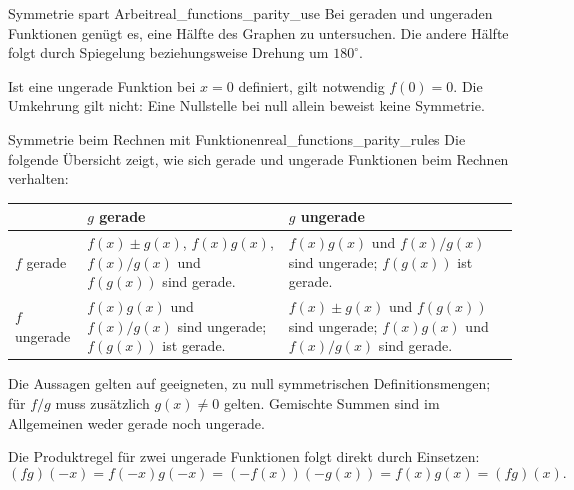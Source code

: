 \begin{KeyPointBox}{Symmetrie spart Arbeit}{real_functions_parity_use}
  Bei geraden und ungeraden Funktionen genügt es, eine Hälfte des Graphen
  zu untersuchen. Die andere Hälfte folgt durch Spiegelung beziehungsweise
  Drehung um $180^\circ$.

  Ist eine ungerade Funktion bei $x=0$ definiert, gilt notwendig
  $f(0)=0$. Die Umkehrung gilt nicht: Eine Nullstelle bei null allein
  beweist keine Symmetrie.
\end{KeyPointBox}

\begin{TheoremBox}{Symmetrie beim Rechnen mit Funktionen}{real_functions_parity_rules}
  Die folgende Übersicht zeigt, wie sich gerade und ungerade Funktionen
  beim Rechnen verhalten:
  \begin{center}
    \renewcommand{\arraystretch}{1.55}
    \begin{tabularx}{\linewidth}{|>{\raggedright\arraybackslash}p{2.5cm}||>{\raggedright\arraybackslash}X|>{\raggedright\arraybackslash}X|}
      \hline
      & \textcolor{THMBlue}{$g$ gerade}
      & \textcolor{green!55!black}{$g$ ungerade}\\ \hline\hline
      \textcolor{THMBlue}{$f$ gerade}
      & $f(x)\pm g(x)$, $f(x)g(x)$, $f(x)/g(x)$ und $f(g(x))$ sind
        \textcolor{THMBlue}{gerade}.
      & $f(x)g(x)$ und $f(x)/g(x)$ sind \textcolor{green!55!black}{ungerade};
        $f(g(x))$ ist \textcolor{THMBlue}{gerade}.\\ \hline
      \textcolor{green!55!black}{$f$ ungerade}
      & $f(x)g(x)$ und $f(x)/g(x)$ sind \textcolor{green!55!black}{ungerade};
        $f(g(x))$ ist \textcolor{THMBlue}{gerade}.
      & $f(x)\pm g(x)$ und $f(g(x))$ sind
        \textcolor{green!55!black}{ungerade};
        $f(x)g(x)$ und $f(x)/g(x)$ sind \textcolor{THMBlue}{gerade}.\\ \hline
    \end{tabularx}
  \end{center}
  Die Aussagen gelten auf geeigneten, zu null symmetrischen
  Definitionsmengen; für $f/g$ muss zusätzlich $g(x)\ne0$ gelten.
  Gemischte Summen sind im Allgemeinen weder gerade noch ungerade.
\end{TheoremBox}
Die Produktregel für zwei ungerade Funktionen folgt direkt durch Einsetzen:
\[
  (fg)(-x)=f(-x)g(-x)=(-f(x))(-g(x))=f(x)g(x)=(fg)(x).
\]
